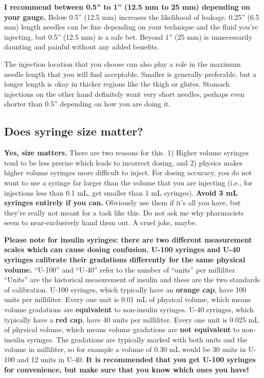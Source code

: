 \documentclass{article}
\begin{document}
\textbf{I recommend between 0.5” to 1” (12.5 mm to 25 mm) depending on your gauge.} Below 0.5” (12.5 mm) increases the likelihood of leakage. 0.25” (6.5 mm) length needles can be fine depending on your technique and the fluid you’re injecting, but 0.5” (12.5 mm) is a safe bet. Beyond 1” (25 mm) is unnecessarily daunting and painful without any added benefits.

The injection location that you choose can also play a role in the maximum needle length that you will find acceptable. Smaller is generally preferable, but a longer length is okay in thicker regions like the thigh or glutes. Stomach injections on the other hand definitely want very short needles, perhaps even shorter than 0.5” depending on how you are doing it. 

\subsection{Does syringe size matter?}\label{5-18}

\textbf{Yes, size matters.} There are two reasons for this. 1) Higher volume syringes tend to be less precise which leads to incorrect dosing, and 2) physics makes higher volume syringes more difficult to inject. For dosing accuracy, you do not want to use a syringe far larger than the volume that you are injecting (i.e., for injections less than 0.1 mL, get smaller than 1 mL syringes). \textbf{Avoid 3 mL syringes entirely if you can.} Obviously use them if it’s all you have, but they’re really not meant for a task like this. Do not ask me why pharmacists seem to near-exclusively hand them out. A cruel joke, maybe.

\textbf{Please note for insulin syringes: there are two different measurement scales which can cause dosing confusion. U-100 syringes and U-40 syringes calibrate their gradations differently for the same physical volume.} “U-100” and “U-40” refer to the number of “units” per milliliter. “Units” are the historical measurement of insulin and these are the two standards of calibration. U-100 syringes, which typically have an \textbf{orange cap}, have 100 units per milliliter. Every one unit is 0.01 mL of physical volume, which means volume gradations are \textbf{equivalent} to non-insulin syringes. U-40 syringes, which typically have a \textbf{red cap}, have 40 units per milliliter. Every one unit is 0.025 mL of physical volume, which means volume gradations are \textbf{not equivalent} to non-insulin syringes. The gradations are typically marked with both units and the volume in milliliter, so for example a volume of 0.30 mL would be 30 units in U-100 and 12 units in U-40. \textbf{It is recommended that you get U-100 syringes for convenience, but make sure that you know which ones you have!}
\end{document}
